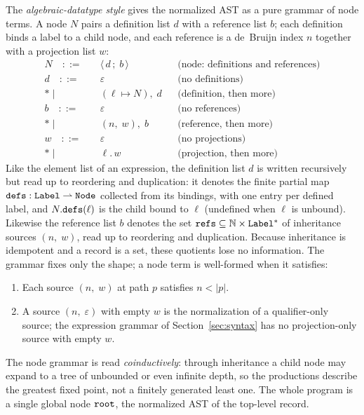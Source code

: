 The \emph{algebraic-datatype style} gives the normalized AST as a pure
grammar of node terms. A node $N$ pairs a definition list $d$ with a
reference list $b$; each definition binds a label to a child node, and
each reference is a de~Bruijn index $n$ together with a projection list
$w$:
\begin{align*}
  N \quad ::= \quad & \langle\, d \,;\; b \,\rangle
  && \text{(node: definitions and references)} \\[6pt]
  d \quad ::= \quad & \varepsilon
  && \text{(no definitions)} \\*
  \mid\quad & (\ell \mapsto N),\; d
  && \text{(definition, then more)} \\[6pt]
  b \quad ::= \quad & \varepsilon
  && \text{(no references)} \\*
  \mid\quad & (n,\; w),\; b
  && \text{(reference, then more)} \\[6pt]
  w \quad ::= \quad & \varepsilon
  && \text{(no projections)} \\*
  \mid\quad & \ell.\, w
  && \text{(projection, then more)}
\end{align*}
Like the element list of an expression, the definition list $d$ is
written recursively but read up to reordering and duplication: it
denotes the finite partial map $\mathtt{defs} : \mathtt{Label} \rightharpoonup \mathtt{Node}$
collected from its bindings, with one entry per defined label, and
$N.\mathtt{defs}(\ell)$ is the child bound to $\ell$ (undefined when $\ell$ is
unbound). Likewise the reference list $b$ denotes the set
$\mathtt{refs} \subseteq \mathbb{N} \times \mathtt{Label}^{*}$ of inheritance sources
$(n,\; w)$, read up to reordering and duplication. Because inheritance
is idempotent and a record is a set, these quotients lose no
information.
The grammar fixes only the shape; a node term is well-formed when it
satisfies:
\begin{enumerate}
  \item Each source $(n,\; w)$ at path $p$ satisfies $n < |p|$.
  \item A source $(n,\; \varepsilon)$ with empty $w$ is the
    normalization of a qualifier-only source; the expression grammar of
    Section~\ref{sec:syntax} has no projection-only source with empty
    $w$.
\end{enumerate} The node grammar is read \emph{coinductively}: through
inheritance a child node may expand to a tree of unbounded or even
infinite depth, so the productions describe the greatest fixed point,
not a finitely generated least one. The whole program is a single
global node $\mathtt{root}$, the normalized AST of the top-level record.

